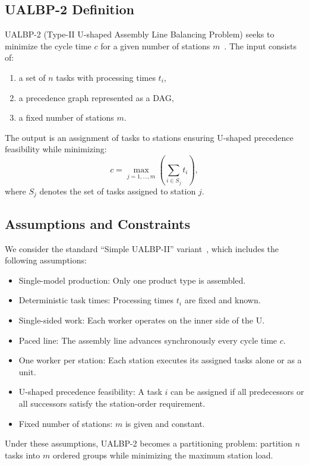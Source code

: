 \documentclass[12pt,a4paper]{article}
\begin{document}
\par
\subsection{UALBP-2 Definition}
UALBP-2 (Type-II U-shaped Assembly Line Balancing Problem) seeks to minimize the
cycle time $c$ for a given number of stations $m$~\cite{scholl_klein_1999}. The input consists of:
\begin{enumerate}
\item a set of $n$ tasks with processing times $t_i$,
\item a precedence graph represented as a DAG,
\item a fixed number of stations $m$.
\end{enumerate}

The output is an assignment of tasks to stations ensuring U-shaped precedence feasibility
while minimizing:
\[
c = \max_{j=1,\ldots,m}\left(\sum_{i\in S_j} t_i\right),
\]
where $S_j$ denotes the set of tasks assigned to station $j$.

\par
\subsection{Assumptions and Constraints}
We consider the standard ``Simple UALBP-II'' variant~\cite{baybars_1986}, which includes the following assumptions:
\begin{itemize}
\item Single-model production: Only one product type is assembled.
\item Deterministic task times: Processing times $t_i$ are fixed and known.
\item Single-sided work: Each worker operates on the inner side of the U.
\item Paced line: The assembly line advances synchronously every cycle time $c$.
\item One worker per station: Each station executes its assigned tasks alone or as a unit.
\item U-shaped precedence feasibility: A task $i$ can be assigned if all predecessors or all
successors satisfy the station-order requirement.
\item Fixed number of stations: $m$ is given and constant.
\end{itemize}

Under these assumptions, UALBP-2 becomes a partitioning problem: partition $n$ tasks
into $m$ ordered groups while minimizing the maximum station load.
\end{document}
